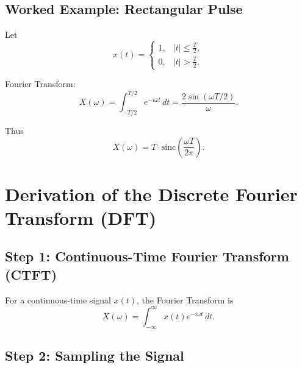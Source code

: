 \documentclass[a4paper,12pt]{article}
\begin{document}
\begin{center}
\end{center}

\subsection{Worked Example: Rectangular Pulse}

Let
\[
x(t) =
\begin{cases}
1, & |t| \leq \tfrac{T}{2}, \\
0, & |t| > \tfrac{T}{2}.
\end{cases}
\]

Fourier Transform:
\[
X(\omega) = \int_{-T/2}^{T/2} e^{-i \omega t}\,dt
= \frac{2\sin(\omega T/2)}{\omega}.
\]

Thus
\[
X(\omega) = T \cdot \mathrm{sinc}\!\left(\frac{\omega T}{2\pi}\right).
\]

\section{\Huge\textbf{Derivation of the Discrete Fourier Transform (DFT)}}

\subsection{Step 1: Continuous-Time Fourier Transform (CTFT)}

For a continuous-time signal $x(t)$, the Fourier Transform is
\[
X(\omega) = \int_{-\infty}^{\infty} x(t) e^{-i\omega t}\,dt.
\]

\subsection{Step 2: Sampling the Signal}
\end{document}
